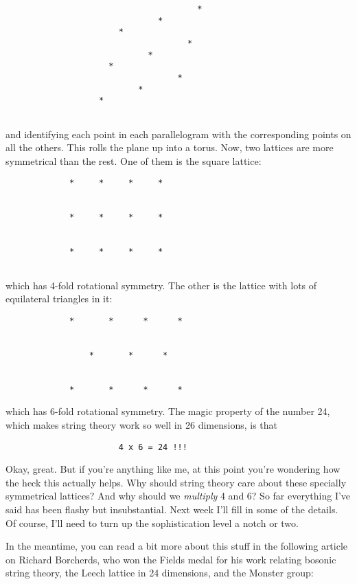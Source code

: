 \begin{verbatim}
                                       *
                               *
                       * 
                                     *
                             *
                     *    
                                   *
                           *
                   *
             
\end{verbatim}
    
and identifying each point in each parallelogram with the corresponding
points on all the others.   This rolls the plane up into a torus.  Now,
two lattices are more symmetrical than the rest.   One of them is the
square lattice:

\begin{verbatim}
             *     *     *     *


             *     *     *     *


             *     *     *     *
         
\end{verbatim}
    
which has 4-fold rotational symmetry.   The other is the lattice with
lots of equilateral triangles in it:


\begin{verbatim}
             *       *      *      *


                 *       *      *                


             *       *      *      *

\end{verbatim}
    
which has 6-fold rotational symmetry.  The magic property of the number
24, which makes string theory work so well in 26 dimensions, is that 

\begin{verbatim}
                       4 x 6 = 24 !!!
\end{verbatim}
    
Okay, great.  But if you're anything like me, at this point you're
wondering how the heck this actually helps.  Why should string theory
care about these specially symmetrical lattices?  And why should we
\emph{multiply} 4 and 6?  So far everything I've said has been flashy but
insubstantial.  Next week I'll fill in some of the details.  Of course,
I'll need to turn up the sophistication level a notch or two.  

In the meantime, you can read a bit more about this stuff in the
following article on Richard Borcherds, who won the Fields medal for his
work relating bosonic string theory, the Leech lattice in 24 dimensions,
and the Monster group:

